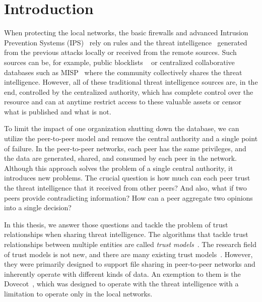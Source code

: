 \chapter{Introduction}
\label{ch:introduction}



When protecting the local networks, the basic firewalls and advanced Intrusion Prevention Systems (IPS)~\cite{zhang2004intrusion} rely on rules and the threat intelligence~\cite{threatintelligence} generated from the previous attacks locally or received from the remote sources.
Such sources can be, for example, public blocklists ~\cite{abuseipdb, binarydefense, dataplane} or centralized collaborative databases such as MISP~\cite{wagner2016misp} where the community collectively shares the threat intelligence.
However, all of these traditional threat intelligence sources are, in the end, controlled by the centralized authority, which has complete control over the resource and can at anytime restrict access to these valuable assets or censor what is published and what is not.

To limit the impact of one organization shutting down the database, we can utilize the peer-to-peer model and remove the central authority and a single point of failure.
In the peer-to-peer networks, each peer has the same privileges, and the data are generated, shared, and consumed by each peer in the network.
Although this approach solves the problem of a single central authority, it introduces new problems. The crucial question is how much can each peer trust the threat intelligence that it received from other peers? And also, what if two peers provide contradicting information? How can a peer aggregate two opinions into a single decision?

In this thesis, we answer those questions and tackle the problem of trust relationships when sharing threat intelligence.
The algorithms that tackle trust relationships between multiple entities are called \textit{trust models}~\cite{wang2003trust}.
The research field of trust models is not new, and there are many existing trust models~\cite{kamvar2003eigentrust, xiong2004peertrust, 1562680, huynh2006integrated, sort, pinyol2013computational, christensen2014hybrid,li2014design, abera2019sadan}.
However, they were primarily designed to support file sharing in peer-to-peer networks and inherently operate with different kinds of data.
An exemption to them is the Dovecot~\cite{dita}, which was designed to operate with the threat intelligence with a limitation to operate only in the local networks.

